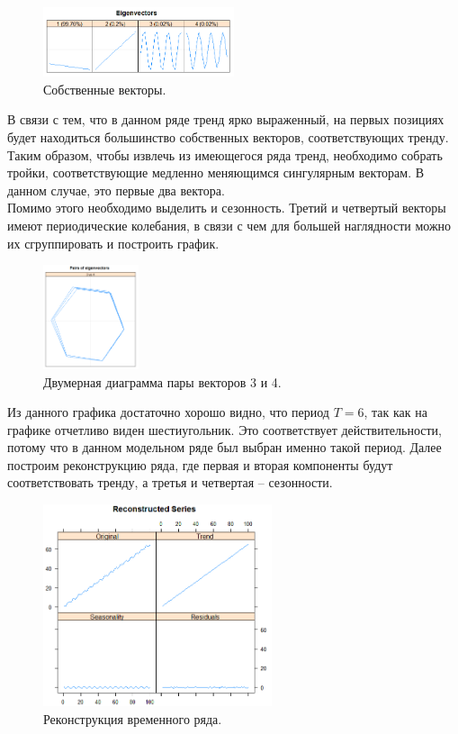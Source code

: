 \documentclass[specialist,
			   substylefile = spbu_report.rtx,
			   subf,href,colorlinks=true, 12pt]{disser}
\begin{document}
\begin{figure}[H]
	\centering
	\includegraphics[width=0.5\textwidth]{r_plot_ts_eig.png}
	\caption{Собственные векторы.}
	\label{fig:graph4}
\end{figure}

В связи с тем, что в данном ряде тренд ярко выраженный, на первых позициях будет находиться большинство собственных векторов, соответствующих тренду. Таким образом, чтобы извлечь из имеющегося ряда тренд, необходимо собрать тройки, соответствующие медленно меняющимся сингулярным векторам. В данном случае, это первые два вектора.\\

Помимо этого необходимо выделить и сезонность. Третий и четвертый векторы имеют периодические колебания, в связи с чем для большей наглядности можно их сгруппировать и построить график.

\begin{figure}[H]
	\centering
	\includegraphics[width=0.25\textwidth]{r_plot_ts_pair.png}
	\caption{Двумерная диаграмма пары векторов 3 и 4.}
	\label{fig:graph5}
\end{figure}

Из данного графика достаточно хорошо видно, что период $T = 6$, так как на графике отчетливо виден шестиугольник. Это соответствует действительности, потому что в данном модельном ряде был выбран именно такой период. Далее построим реконструкцию ряда, где первая и вторая компоненты будут соответствовать тренду, а третья и четвертая – сезонности. 

\begin{figure}[H]
	\centering
	\includegraphics[width=0.6\textwidth]{r_plot_ts_rec.png}
	\caption{Реконструкция временного ряда.}
	\label{fig:graph6}
\end{figure}
\end{document}
